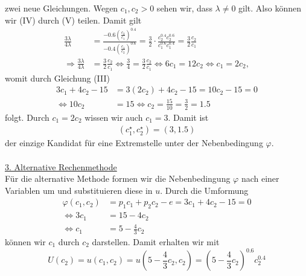 zwei neue Gleichungen.
Wegen $c_1, c_2 > 0 $ sehen wir, dass $\lambda \neq 0 $ gilt.
Also können wir (IV) durch (V) teilen.
Damit gilt
\begin{equation*}
\begin{split}
\frac{3 \lambda }{4 \lambda} 
&= \frac{-0.6 \left( \frac{c_2}{c_1} \right)^{0.4}}{- 0.4 \left( \frac{c_1}{c_2} \right)^{0.6}}
= \frac{3}{2} \cdot \frac{c_2^{0.4} c_2^{0.6}}{c_1^{0.6} c_1^{0.4}}
= \frac{3}{2} \frac{c_2}{c_1}\\
\Rightarrow
\frac{3 \lambda }{4 \lambda} &= \frac{3}{2} \frac{c_2}{c_1}
\Leftrightarrow
\frac{3  }{4 } = \frac{3}{2} \frac{c_2}{c_1}
\Leftrightarrow
6 c_1 = 12 c_2
\Leftrightarrow
c_1 = 2 c_2,
\end{split}
\end{equation*}
womit durch Gleichung (III)
\begin{equation*}
\begin{split}
3 c_1 + 4 c_2 - 15 &= 3 (2c_2) + 4 c_2 -15 = 10 c_2  -15 = 0 \\
\Leftrightarrow
10 c_2 &= 15 
\Leftrightarrow
c_2 = \frac{15}{10} = \frac{3}{2} = 1.5  
\end{split}
\end{equation*}
folgt.
Durch $c_1 = 2 c_2 $ wissen wir auch $c_1 = 3$.
Damit ist 
\begin{align*}
(c_1^\star, c_2^\star) = ( 3, 1.5)
\end{align*}
der einzige Kandidat für eine Extremstelle unter der Nebenbedingung $\varphi$.\\
\\
\underline{3. Alternative Rechenmethode}\\
Für die alternative Methode formen wir die Nebenbedingung $\varphi$ nach einer Variablen um
und substituieren diese in $u$.
Durch die Umformung 
\begin{equation*}
\begin{split}
\varphi(c_1,c_2) &= p_1 c_1 + p_2 c_2 -e = 3 c_1 + 4 c_2 - 15 = 0\\
\Leftrightarrow
3 c_1 &= 15 - 4 c_2 \\
\Leftrightarrow
c_1 &= 5 - \frac{4}{3} c_2
\end{split}
\end{equation*}
können wir $c_1 $ durch $c_2$ darstellen.
Damit erhalten wir mit 
\begin{equation}
U(c_2) = u( c_1 , c_2) 
= u\left( 5 - \frac{4}{3}c_2,c_2 \right) 
=\left( 5 - \frac{4}{3}c_2 \right)^{0.6} c_2^{0.4}
\end{equation}
